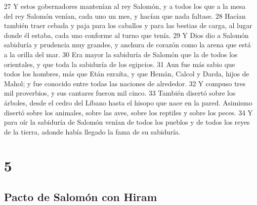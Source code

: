27 Y estos gobernadores mantenían al rey Salomón, y a todos los que a la mesa del rey Salomón venían, cada uno un mes, y hacían que nada faltase.
28 Hacían también traer cebada y paja para los caballos y para las bestias de carga, al lugar donde él estaba, cada uno conforme al turno que tenía.
29 Y Dios dio a Salomón sabiduría y prudencia muy grandes, y anchura de corazón como la arena que está a la orilla del mar.
30 Era mayor la sabiduría de Salomón que la de todos los orientales, y que toda la sabiduría de los egipcios.
31 Aun fue más sabio que todos los hombres, más que Etán ezraíta, y que Hemán, Calcol y Darda, hijos de Mahol; y fue conocido entre todas las naciones de alrededor.
32 Y compuso tres mil proverbios, y sus cantares fueron mil cinco. 
33 También disertó sobre los árboles, desde el cedro del Líbano hasta el hisopo que nace en la pared. Asimismo disertó sobre los animales, sobre las aves, sobre los reptiles y sobre los peces.
34 Y para oír la sabiduría de Salomón venían de todos los pueblos y de todos los reyes de la tierra, adonde había llegado la fama de su sabiduría.

\chapter{5}

\section*{Pacto de Salomón con Hiram}

